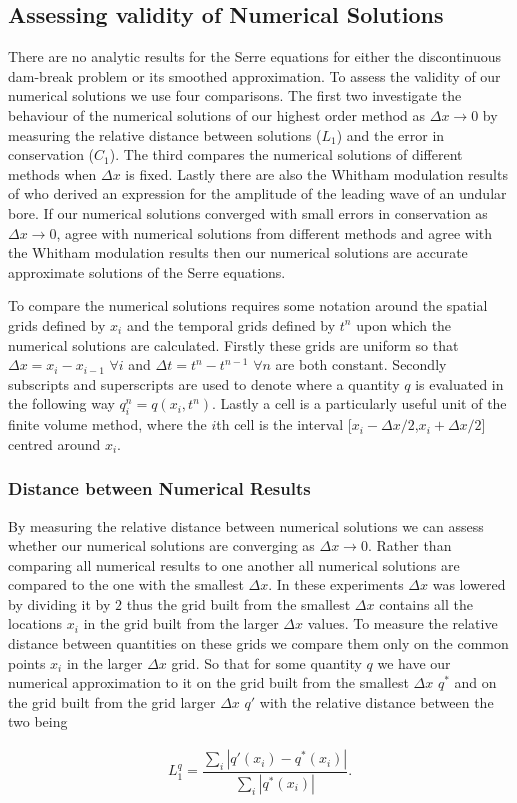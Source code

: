 \documentclass[times]{elsarticle}
\begin{document}
\subsection{Assessing validity of Numerical Solutions}
There are no analytic results for the Serre equations for either the discontinuous dam-break problem or its smoothed approximation. To assess the validity of our numerical solutions we use four comparisons. The first two investigate the behaviour of the numerical solutions of our highest order method as $\Delta x \rightarrow 0$ by measuring the relative distance between solutions ($L_1$) and the error in conservation ($C_1$). The third compares the numerical solutions of different methods when $\Delta x$ is fixed. Lastly there are also the Whitham modulation results of \citet{El-etal-2006} who derived an expression for the amplitude of the leading wave of an undular bore. If our numerical solutions converged with small errors in conservation as $\Delta x \rightarrow 0$, agree with numerical solutions from different methods and agree with the Whitham modulation results then our numerical solutions are accurate approximate solutions of the Serre equations. 

To compare the numerical solutions requires some notation around the spatial grids defined by $x_i$ and the temporal grids defined by $t^n$ upon which the numerical solutions are calculated. Firstly these grids are uniform so that $\Delta x = x_{i} - x_{i-1}$ $\forall i$ and $\Delta t = t^{n} - t^{n-1}$ $\forall n$ are both constant. Secondly subscripts and superscripts are used to denote where a quantity $q$ is evaluated in the following way $q_i^n = q(x_i,t^n)$. Lastly a cell is a particularly useful unit of the finite volume method, where the $i$th cell is the interval [$x_i -\Delta x/2$,$x_i +\Delta x/2$] centred around $x_{i}$. 

\subsubsection{Distance between Numerical Results}
By measuring the relative distance between numerical solutions we can assess whether our numerical solutions are converging as $\Delta x  \rightarrow 0$. Rather than comparing all numerical results to one another all numerical solutions are compared to the one with the smallest $\Delta x$. In these experiments $\Delta x$ was lowered by dividing it by $2$ thus the grid built from the smallest $\Delta x$ contains all the locations $x_i$ in the grid built from the larger $\Delta x$ values. To measure the relative distance between quantities on these grids we compare them only on the common points $x_i$ in the larger $\Delta x$ grid. So that for some quantity $q$ we have our numerical approximation to it on the grid built from the smallest $\Delta x$ $q^*$ and on the grid built from the grid larger $\Delta x$ $q'$ with the relative distance between the two being
\begin{linenomath*}
	\begin{gather}
	L_1^{q} = \dfrac{\sum_{i} \left| q'(x_i)  - q^*(x_i)\right|}{\sum_{i} \left| q^*(x_i)\right|}.
	\label{eq:L1def}
	\end{gather}
\end{linenomath*}
\end{document}
